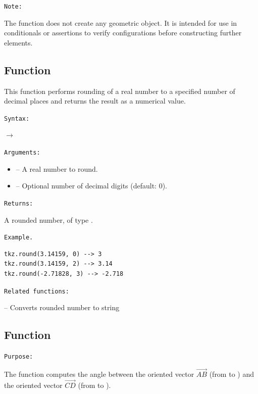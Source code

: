 \medskip
\texttt{Note: }

The function does not create any geometric object. It is intended for use in conditionals or assertions to verify configurations before constructing further elements.

\subsection{Function }
\label{sub:function_tkz_round}

This function performs rounding of a real number to a specified number of decimal places and returns the result as a numerical value.

\medskip
\texttt{Syntax: }

\begin{center}
 \hspace{4em} $\rightarrow$ 
\end{center}


\texttt{Arguments: }

\begin{itemize}
\item {} – A real number to round.
\item {} – Optional number of decimal digits (default: 0).
\end{itemize}

\medskip
\texttt{Returns: }

A rounded number, of type .

\medskip
\texttt{Example.}

\begin{verbatim}
tkz.round(3.14159, 0) --> 3
tkz.round(3.14159, 2) --> 3.14
tkz.round(-2.71828, 3) --> -2.718
\end{verbatim}

\medskip
\texttt{Related functions: }

  – Converts rounded number to string


\subsection{Function }
\label{sub:angle_between_vectors}

\texttt{Purpose: }

The function computes the angle between the oriented vector $\vec{AB}$ (from  to ) and the oriented vector $\vec{CD}$ (from  to ).

